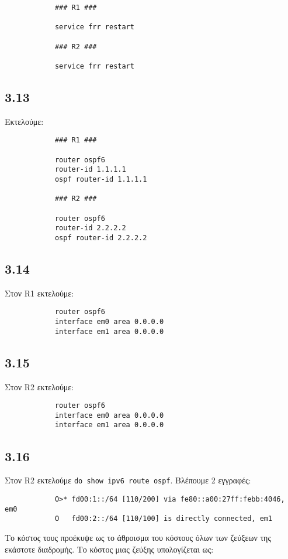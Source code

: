 \documentclass[a4paper, 12pt]{article}
\begin{document}
		\begin{verbatim}
			### R1 ###
			
			service frr restart
			
			### R2 ###
			
			service frr restart
		\end{verbatim}

	\subsection*{3.13} 
		Εκτελούμε:
		
		\begin{verbatim}
			### R1 ###
			
			router ospf6
			router-id 1.1.1.1
			ospf router-id 1.1.1.1
			
			### R2 ###
			
			router ospf6
			router-id 2.2.2.2
			ospf router-id 2.2.2.2
		\end{verbatim}

	\subsection*{3.14}
		Στον R1 εκτελούμε:
		
		\begin{verbatim}
			router ospf6 
			interface em0 area 0.0.0.0
			interface em1 area 0.0.0.0
		\end{verbatim}

	\subsection*{3.15}
		Στον R2 εκτελούμε:
		
		\begin{verbatim}
			router ospf6
			interface em0 area 0.0.0.0
			interface em1 area 0.0.0.0
		\end{verbatim}

	\subsection*{3.16}
		Στον R2 εκτελούμε \verb|do show ipv6 route ospf|. Βλέπουμε 2 εγγραφές:
		
		\begin{verbatim}
			O>* fd00:1::/64 [110/200] via fe80::a00:27ff:febb:4046, em0
			O   fd00:2::/64 [110/100] is directly connected, em1
		\end{verbatim}
		
		Το κόστος τους προέκυψε ως το άθροισμα του κόστους όλων των ζεύξεων της εκάστοτε διαδρομής. Το κόστος μιας ζεύξης υπολογίζεται ως:
		
\end{document}
